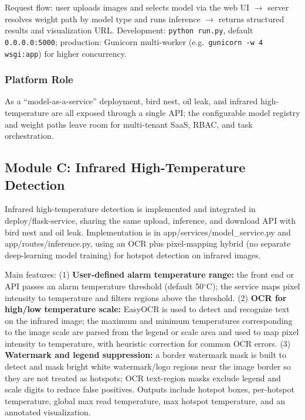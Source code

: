 \documentclass[12pt,a4paper]{article}
\begin{document}
Request flow: user uploads images and selects model via the web UI $\rightarrow$ server resolves weight path by model type and runs inference $\rightarrow$ returns structured results and visualization URL. Development: \texttt{python run.py}, default \texttt{0.0.0.0:5000}; production: Gunicorn multi-worker (e.g.\ \texttt{gunicorn -w 4 wsgi:app}) for higher concurrency.

\subsubsection{Platform Role}

As a ``model-as-a-service'' deployment, bird nest, oil leak, and infrared high-temperature are all exposed through a single API; the configurable model registry and weight paths leave room for multi-tenant SaaS, RBAC, and task orchestration.

\subsection{Module C: Infrared High-Temperature Detection}

Infrared high-temperature detection is implemented and integrated in deploy/flask-service, sharing the same upload, inference, and download API with bird nest and oil leak. Implementation is in app/services/model\_service.py and app/routes/inference.py, using an OCR plus pixel-mapping hybrid (no separate deep-learning model training) for hotspot detection on infrared images.

Main features: (1) \textbf{User-defined alarm temperature range:} the front end or API passes an alarm temperature threshold (default 50$^\circ$C); the service maps pixel intensity to temperature and filters regions above the threshold. (2) \textbf{OCR for high/low temperature scale:} EasyOCR is used to detect and recognize text on the infrared image; the maximum and minimum temperatures corresponding to the image scale are parsed from the legend or scale area and used to map pixel intensity to temperature, with heuristic correction for common OCR errors. (3) \textbf{Watermark and legend suppression:} a border watermark mask is built to detect and mask bright white watermark/logo regions near the image border so they are not treated as hotspots; OCR text-region masks exclude legend and scale digits to reduce false positives. Outputs include hotspot boxes, per-hotspot temperature, global max read temperature, max hotspot temperature, and an annotated visualization.
\end{document}
